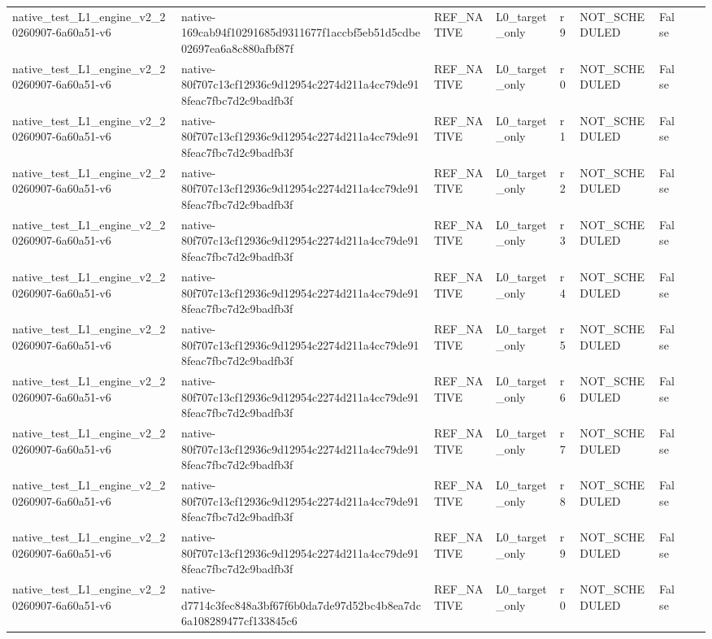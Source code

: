 \begin{tabular}{lllllllll}
native\_test\_L1\_engine\_v2\_20260907-6a60a51-v6 & native-169cab94f10291685d9311677f1accbf5eb51d5cdbe02697ea6a8c880afbf87f & REF\_NATIVE & L0\_target\_only & r9 & NOT\_SCHEDULED & False &  &  \\
native\_test\_L1\_engine\_v2\_20260907-6a60a51-v6 & native-80f707c13cf12936c9d12954c2274d211a4cc79de918feac7fbc7d2c9badfb3f & REF\_NATIVE & L0\_target\_only & r0 & NOT\_SCHEDULED & False &  &  \\
native\_test\_L1\_engine\_v2\_20260907-6a60a51-v6 & native-80f707c13cf12936c9d12954c2274d211a4cc79de918feac7fbc7d2c9badfb3f & REF\_NATIVE & L0\_target\_only & r1 & NOT\_SCHEDULED & False &  &  \\
native\_test\_L1\_engine\_v2\_20260907-6a60a51-v6 & native-80f707c13cf12936c9d12954c2274d211a4cc79de918feac7fbc7d2c9badfb3f & REF\_NATIVE & L0\_target\_only & r2 & NOT\_SCHEDULED & False &  &  \\
native\_test\_L1\_engine\_v2\_20260907-6a60a51-v6 & native-80f707c13cf12936c9d12954c2274d211a4cc79de918feac7fbc7d2c9badfb3f & REF\_NATIVE & L0\_target\_only & r3 & NOT\_SCHEDULED & False &  &  \\
native\_test\_L1\_engine\_v2\_20260907-6a60a51-v6 & native-80f707c13cf12936c9d12954c2274d211a4cc79de918feac7fbc7d2c9badfb3f & REF\_NATIVE & L0\_target\_only & r4 & NOT\_SCHEDULED & False &  &  \\
native\_test\_L1\_engine\_v2\_20260907-6a60a51-v6 & native-80f707c13cf12936c9d12954c2274d211a4cc79de918feac7fbc7d2c9badfb3f & REF\_NATIVE & L0\_target\_only & r5 & NOT\_SCHEDULED & False &  &  \\
native\_test\_L1\_engine\_v2\_20260907-6a60a51-v6 & native-80f707c13cf12936c9d12954c2274d211a4cc79de918feac7fbc7d2c9badfb3f & REF\_NATIVE & L0\_target\_only & r6 & NOT\_SCHEDULED & False &  &  \\
native\_test\_L1\_engine\_v2\_20260907-6a60a51-v6 & native-80f707c13cf12936c9d12954c2274d211a4cc79de918feac7fbc7d2c9badfb3f & REF\_NATIVE & L0\_target\_only & r7 & NOT\_SCHEDULED & False &  &  \\
native\_test\_L1\_engine\_v2\_20260907-6a60a51-v6 & native-80f707c13cf12936c9d12954c2274d211a4cc79de918feac7fbc7d2c9badfb3f & REF\_NATIVE & L0\_target\_only & r8 & NOT\_SCHEDULED & False &  &  \\
native\_test\_L1\_engine\_v2\_20260907-6a60a51-v6 & native-80f707c13cf12936c9d12954c2274d211a4cc79de918feac7fbc7d2c9badfb3f & REF\_NATIVE & L0\_target\_only & r9 & NOT\_SCHEDULED & False &  &  \\
native\_test\_L1\_engine\_v2\_20260907-6a60a51-v6 & native-d7714c3fec848a3bf67f6b0da7de97d52bc4b8ea7dc6a108289477cf133845c6 & REF\_NATIVE & L0\_target\_only & r0 & NOT\_SCHEDULED & False &  &  \\

\end{tabular}
